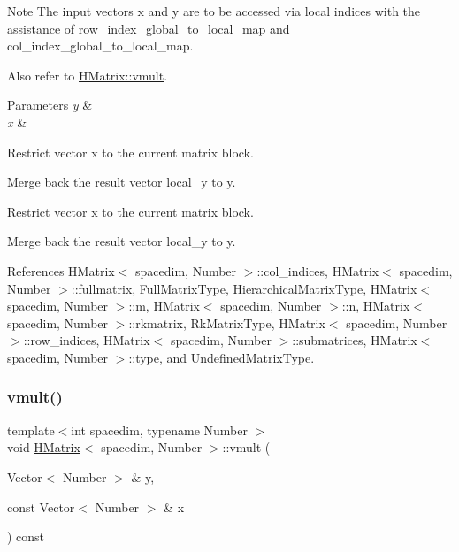 \begin{DoxyDescription}
\item[Note ]The input vectors {\ttfamily x} and {\ttfamily y} are to be accessed via local indices with the assistance of {\ttfamily row\+\_\+index\+\_\+global\+\_\+to\+\_\+local\+\_\+map} and {\ttfamily col\+\_\+index\+\_\+global\+\_\+to\+\_\+local\+\_\+map}. 
\end{DoxyDescription}

Also refer to \hyperlink{classHMatrix_aa11b5761aba86606effd14b4bdf31912}{H\+Matrix\+::vmult}. 
\begin{DoxyParams}{Parameters}
{\em y} & \\
\hline
{\em x} & \\
\hline
\end{DoxyParams}
Restrict vector x to the current matrix block.

Merge back the result vector {\ttfamily local\+\_\+y} to {\ttfamily y}.

Restrict vector x to the current matrix block.

Merge back the result vector {\ttfamily local\+\_\+y} to {\ttfamily y}.

References H\+Matrix$<$ spacedim, Number $>$\+::col\+\_\+indices, H\+Matrix$<$ spacedim, Number $>$\+::fullmatrix, Full\+Matrix\+Type, Hierarchical\+Matrix\+Type, H\+Matrix$<$ spacedim, Number $>$\+::m, H\+Matrix$<$ spacedim, Number $>$\+::n, H\+Matrix$<$ spacedim, Number $>$\+::rkmatrix, Rk\+Matrix\+Type, H\+Matrix$<$ spacedim, Number $>$\+::row\+\_\+indices, H\+Matrix$<$ spacedim, Number $>$\+::submatrices, H\+Matrix$<$ spacedim, Number $>$\+::type, and Undefined\+Matrix\+Type.

\mbox{\label{classHMatrix_aa11b5761aba86606effd14b4bdf31912}} 
\subsubsection{\texorpdfstring{vmult()}{vmult()}\hspace{0.1cm}{\footnotesize\ttfamily [1/4]}}
{\footnotesize\ttfamily template$<$int spacedim, typename Number $>$ \\
void \hyperlink{classHMatrix}{H\+Matrix}$<$ spacedim, Number $>$\+::vmult (\begin{DoxyParamCaption}\item[{Vector$<$ Number $>$ \&}]{y,  }\item[{const Vector$<$ Number $>$ \&}]{x }\end{DoxyParamCaption}) const}

